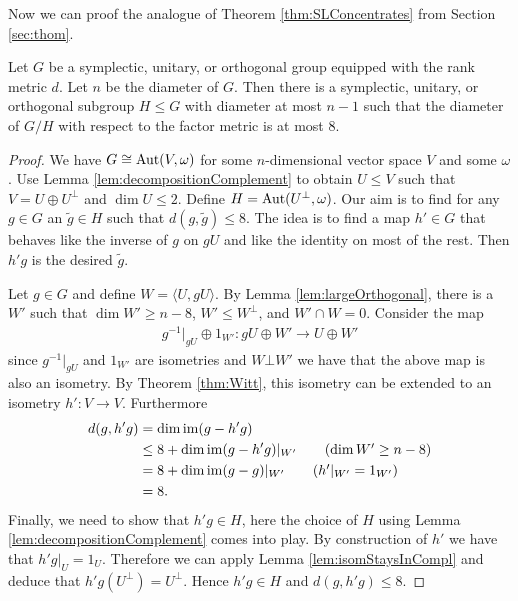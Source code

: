 Now we can proof the analogue of Theorem \ref{thm:SLConcentrates} from Section \ref{sec:thom}.
		
		
\begin{theorem}\label{thm:suoBoundDiam}
				
	Let $G$ be a symplectic, unitary, or orthogonal group equipped with the rank metric $d$. Let $n$ be the diameter of $G$. Then there is a symplectic, unitary, or orthogonal subgroup $H\leq G$ with diameter at most $n-1$ such that the diameter of $G/H$ with respect to the factor metric is at most $8$.
\end{theorem}
\begin{proof}
	We have $G\cong\operatorname{Aut}(V,\omega)$ for some $n$-dimensional vector space $V$ and some $\omega$. Use Lemma \ref{lem:decompositionComplement} to obtain $U\leq V$ such that $V=U\oplus U^\bot$ and $\dim U\leq2$. Define $H=\operatorname{Aut}(U^\bot,\omega)$. Our aim is to find for any $g\in G$ an $\tilde g\in H$ such that $d(g,\tilde g)\leq8$.
	The idea is to find a map $h'\in G$ that behaves like the inverse of $g$ on $gU$ and like the identity on most of the rest. Then $h'g$ is the desired $\tilde g$.
				
	Let $g\in G$ and define $W=\langle U,gU\rangle$. By Lemma \ref{lem:largeOrthogonal}, there is a $W'$ such that $\dim W'\geq n-8$, $W'\leq W^\bot$, and $W'\cap W=0$. Consider the map
	\begin{align*}
		g^{-1}|_{gU}\oplus 1_{W'}\colon gU\oplus W'\to U\oplus W' 
	\end{align*}
	since $g^{-1}|_{gU}$ and $1_{W'}$ are isometries and $W\bot W'$ we have that the above map is also an isometry. By Theorem \ref{thm:Witt}, this isometry can be extended to an isometry $h'\colon V\to V$. Furthermore
	\begin{align*}
		d(g,h'g) & =\dim\im (g-h'g)                                    \\
		         & \leq 8+\dim \im(g-h'g)|_{W'}\tag{$\dim W'\geq n-8$} \\
		         & = 8+\dim \im(g-g)|_{W'}\tag{$h'|_{W'}=1_{W'}$}      \\
		         & =8.                                                 
	\end{align*}
	Finally, we need to show that $h'g\in H$, here the choice of $H$ using Lemma \ref{lem:decompositionComplement} comes into play. By construction of $h'$ we have that $h'g|_U=1_U$. Therefore we can apply Lemma \ref{lem:isomStaysInCompl} and deduce that $h'g(U^\bot)= U^\bot$. Hence $h'g\in H$ and $d(g,h'g)\leq8$.	
\end{proof}
		
